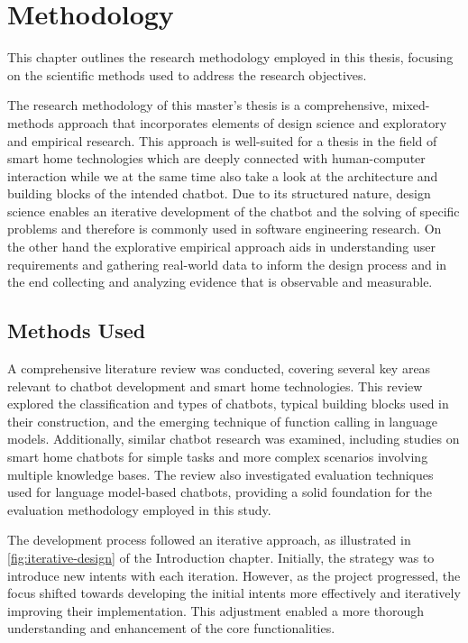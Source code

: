 \chapter{Methodology}
\label{chap:method}
This chapter outlines the research methodology employed in this thesis, focusing on the scientific methods used to address the research objectives.

The research methodology of this master's thesis is a comprehensive, mixed-methods approach that incorporates elements of design science and exploratory and empirical research.
This approach is well-suited for a thesis in the field of smart home technologies which are deeply connected with human-computer interaction while we at the same time also take a look at the architecture and building blocks of the intended chatbot.
Due to its structured nature, design science enables an iterative development of the chatbot and the solving of specific problems and therefore is commonly used in software engineering research.
On the other hand the explorative empirical approach aids in understanding user requirements and gathering real-world data to inform the design process and in the end collecting and analyzing evidence that is observable and measurable.

\section*{Methods Used}
A comprehensive literature review was conducted, covering several key areas relevant to chatbot development and smart home technologies. This review explored the classification and types of chatbots, typical building blocks used in their construction, and the emerging technique of function calling in language models. Additionally, similar chatbot research was examined, including studies on smart home chatbots for simple tasks and more complex scenarios involving multiple knowledge bases. The review also investigated evaluation techniques used for language model-based chatbots, providing a solid foundation for the evaluation methodology employed in this study.

The development process followed an iterative approach, as illustrated in \cref{fig:iterative-design} of the Introduction chapter. Initially, the strategy was to introduce new intents with each iteration. However, as the project progressed, the focus shifted towards developing the initial intents more effectively and iteratively improving their implementation. This adjustment enabled a more thorough understanding and enhancement of the core functionalities.

